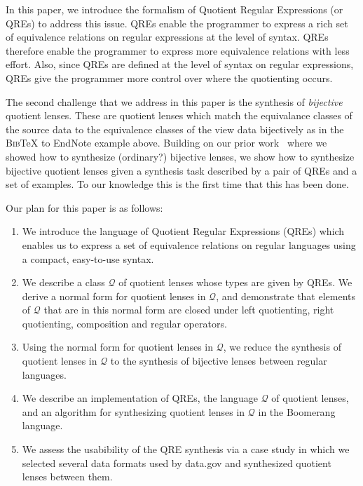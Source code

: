 \documentclass{svproc}
\begin{document}
In this paper, we introduce the formalism of Quotient Regular Expressions (or
QREs) to address this issue. QREs enable the programmer to express
a rich set of equivalence relations on regular expressions at the level of
syntax. QREs therefore enable the programmer to express more equivalence
relations with less effort. Also, since QREs are defined at the level of
syntax on regular expressions, QREs give the programmer more control over where
the quotienting occurs.

The second challenge that we address in this paper is the synthesis of
\textit{bijective} quotient lenses. These are quotient lenses which match the
equivalance classes of the source data to the equivalence classes of the view
data bijectively as in the \textsc{Bib}\TeX{} to EndNote example above. 
Building on our prior work~\cite{popl18} where we showed how to synthesize
(ordinary?) bijective lenses, we show how to synthesize bijective quotient
lenses given a synthesis task described by a pair of QREs and a set of
examples. To our knowledge this is the first time that this has been done.

Our plan for this paper is as follows:
\begin{enumerate}
  \item
  We introduce the language of Quotient Regular Expressions (QREs) which enables
  us to express a set of equivalence relations on regular languages using a
  compact, easy-to-use syntax.
  \item
  We describe a class $\mathcal{Q}$ of quotient lenses whose types are given by
  QREs. We derive a normal form for quotient lenses in $\mathcal{Q}$, and
  demonstrate that elements of $\mathcal{Q}$ that are in this normal form are
  closed under left quotienting, right quotienting, composition and regular
  operators.
  \item
  Using the normal form for quotient lenses in $\mathcal{Q}$, we reduce the
  synthesis of quotient lenses in $\mathcal{Q}$ to the synthesis of bijective
  lenses between regular languages. 
  \item
  We describe an implementation of QREs, the language $\mathcal{Q}$ of quotient
  lenses, and an algorithm for synthesizing quotient lenses in $\mathcal{Q}$ in
  the Boomerang language.
  \item
  We assess the usabibility of the QRE synthesis via a case study in which we
  selected several data formats used by data.gov and synthesized quotient lenses
  between them.
\end{enumerate}
\end{document}
